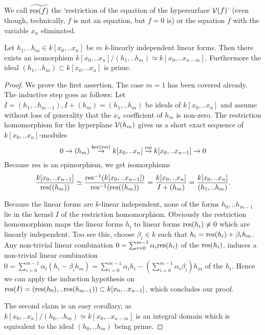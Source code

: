 \begin{definition}
We call $\widetilde{{\operatorname{res}}(f)}$ the `restriction of the equation of the hypersurface $\operatorname{\mathcal V}(f)$' (even though, technically, $f$ is not an equation, but $f=0$ is)
 or the equation $f$ with the variable $x_n$ eliminated.
\end{definition}


\begin{corollary} \label{corollaryRadical}
Let $h_1,.. h_m \in k[x_0,..x_n]$ be $m$ $k$-linearly independent linear forms.
Then there exists an isomorphism $k[x_0,..x_n]/(h_1,..h_m) \simeq k[x_0,..x_{n-m}]$.
Furthermore the ideal $(h_1,..h_m)\subset k[x_0,..x_n]$ is prime.
\end{corollary}
\begin{proof}
We prove the first assertion.
The case $m=1$ has been covered already.
The inductive step goes as follows:
Let $I = (h_1,..h_{m-1}), I+(h_m) = (h_1,..h_m)$ be ideals of $k[x_0,..x_n]$ and assume without loss of generality that the $x_n$ coefficient of $h_m$ is non-zero.
The restriction homomorphism for the hyperplane $\operatorname{\mathcal V}(h_m)$ gives us a short exact sequence of $k[x_0,..x_n]$-modules
\begin{equation}
0 \to (h_m) \overset{\ker({\operatorname{res}})}\to k[x_0,..x_n] \overset{{\operatorname{res}}}\to k[x_0,..x_{n-1}] \to 0
\end{equation}
Because ${\operatorname{res}}$ is an epimorphism, we get isomorphisms
\begin{equation}
\frac{k[x_0,..x_{n-1}]}{{\operatorname{res}}((h_m))}
\simeq \frac{{\operatorname{res}}^{-1}(k[x_0,..x_{n-1}])}{{\operatorname{res}}^{-1}({\operatorname{res}}((h_m))}
= \frac{k[x_0,..x_n]}{I+(h_m)}
= \frac{k[x_0,..x_n]}{(h_1,..h_m)}.
\end{equation}

Because the linear forms are $k$-linear independent, none of the forms $h_0,..h_{m-1}$ lie in the kernel $I$ of the restriction homomorphism.
Obviously the restriction homomorphism maps the linear forms $h_i$ to linear forms ${\operatorname{res}}(h_i) \neq 0$ which are linearly independent.
Too see this, choose $\beta_i \in k$ such that $h_i = {\operatorname{res}}(h_i) + \beta_i h_m$.
Any non-trivial linear combination $0 = \sum_{i=0}^{m-1} \alpha_i {\operatorname{res}}(h_i)$ of the ${\operatorname{res}}(h_i)$, induces a non-trivial linear combination $0 = \sum_{i=0}^{m-1} \alpha_i(h_i - \beta_i h_m) = \sum_{i=0}^{m-1}\alpha_i h_i - (\sum_{i=0}^{m-1} \alpha_i\beta_i)h_m$ of the $h_i$.
Hence we can apply the induction hypothesis on ${\operatorname{res}}(I) = ({\operatorname{res}}(h_0),..{\operatorname{res}}(h_{m-1})) \subset k[x_0,..x_{n-1}]$, which concludes our proof.


The second claim is an easy corollary, as $k[x_0,..x_n]/(h_0,..h_m) \simeq k[x_0,..x_{n-m}]$ is an integral domain which is equivalent to the ideal $(h_0,..h_m)$ being prime.

\end{proof}

